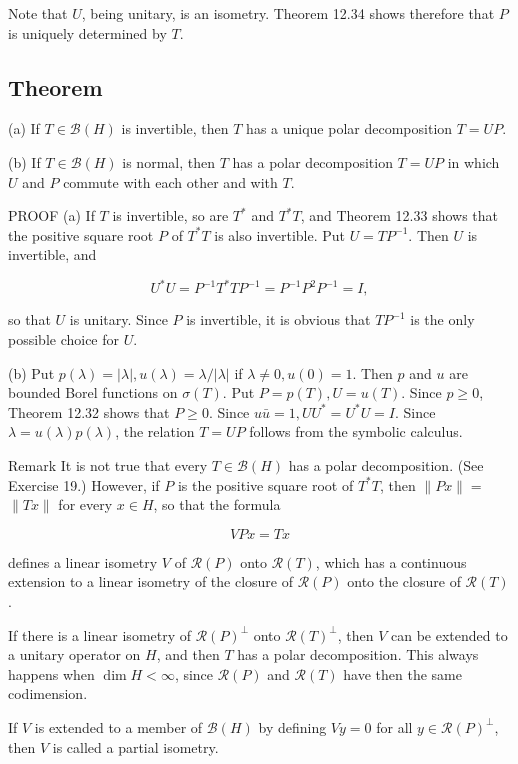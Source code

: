 \documentclass[10pt]{article}
\begin{document}
Note that $U$, being unitary, is an isometry. Theorem 12.34 shows therefore that $P$ is uniquely determined by $T$.

\subsection{Theorem}
(a) If $T \in \mathscr{B}(H)$ is invertible, then $T$ has a unique polar decomposition $T=U P$.

(b) If $T \in \mathscr{B}(H)$ is normal, then $T$ has a polar decomposition $T=U P$ in which $U$ and $P$ commute with each other and with $T$.

PROOF (a) If $T$ is invertible, so are $T^{*}$ and $T^{*} T$, and Theorem 12.33 shows that the positive square root $P$ of $T^{*} T$ is also invertible. Put $U=T P^{-1}$. Then $U$ is invertible, and

$$
U^{*} U=P^{-1} T^{*} T P^{-1}=P^{-1} P^{2} P^{-1}=I,
$$

so that $U$ is unitary. Since $P$ is invertible, it is obvious that $T P^{-1}$ is the only possible choice for $U$.

(b) Put $p(\lambda)=|\lambda|, u(\lambda)=\lambda /|\lambda|$ if $\lambda \neq 0, u(0)=1$. Then $p$ and $u$ are bounded Borel functions on $\sigma(T)$. Put $P=p(T), U=u(T)$. Since $p \geq 0$, Theorem 12.32 shows that $P \geq 0$. Since $u \bar{u}=1, U U^{*}=U^{*} U=I$. Since $\lambda=u(\lambda) p(\lambda)$, the relation $T=U P$ follows from the symbolic calculus.

Remark It is not true that every $T \in \mathscr{B}(H)$ has a polar decomposition. (See Exercise 19.) However, if $P$ is the positive square root of $T^{*} T$, then $\|P x\|=$ $\|T x\|$ for every $x \in H$, so that the formula

$$
V P x=T x
$$

defines a linear isometry $V$ of $\mathscr{R}(P)$ onto $\mathscr{R}(T)$, which has a continuous extension to a linear isometry of the closure of $\mathscr{R}(P)$ onto the closure of $\mathscr{R}(T)$.

If there is a linear isometry of $\mathscr{R}(P)^{\perp}$ onto $\mathscr{R}(T)^{\perp}$, then $V$ can be extended to a unitary operator on $H$, and then $T$ has a polar decomposition. This always happens when $\operatorname{dim} H<\infty$, since $\mathscr{R}(P)$ and $\mathscr{R}(T)$ have then the same codimension.

If $V$ is extended to a member of $\mathscr{B}(H)$ by defining $V y=0$ for all $y \in \mathscr{R}(P)^{\perp}$, then $V$ is called a partial isometry.
\end{document}
